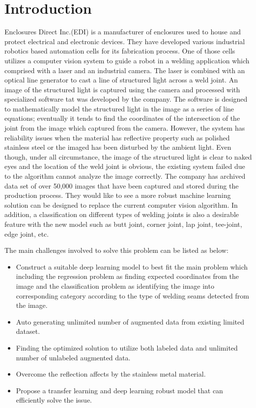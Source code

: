 \section{Introduction}
\label{intro}
Enclosures Direct Inc.(EDI) is a manufacturer of enclosures used to house and protect electrical and electronic devices. 
They have developed various industrial robotics based automation cells for its fabrication process. One of those cells utilizes
a computer vision system to guide a robot in a welding application which comprised with a laser and an industrial camera.
The laser is combined with an optical line generator to cast a line of structured light across a weld joint. An image of the 
structured light is captured using the camera and processed with specialized software tat was developed by the company.
The software is designed to mathematically model the structured light in the image as a series of line equations; eventually
it tends to find the coordinates of the intersection of the joint from the image which captured from the camera. However, 
the system has reliability issues when the material has reflective property such as polished stainless steel or the imaged
has been disturbed by the ambient light. Even though, under all circumstance, the image of the structured light is clear to 
naked eyes and the location of the weld joint is obvious, the existing system failed due to the algorithm cannot analyze the
image correctly. The company has archived data set of over 50,000 images that have been captured and stored during the 
production process. They would like to see a more robust machine learning solution can be designed to replace the current 
computer vision algorithm. In addition, a classification on different types of welding joints is also a desirable feature
with the new model such as butt joint, corner joint, lap joint, tee-joint, edge joint, etc.

The main challenges involved to solve this problem can be listed as below:
\begin{itemize}
\item Construct a suitable deep learning model to best fit the main problem which including the regression problem as finding 
       expected coordinates from the image and the classification problem as identifying the image into corresponding 
       category according to the type of welding seams detected from the image.
\item Auto generating unlimited number of augmented data from existing limited dataset. 
\item Finding the optimized solution to utilize both labeled data and unlimited number of unlabeled augmented data.
\item Overcome the reflection affects by the stainless metal material.
\item Propose a transfer learning and deep learning robust model that can efficiently solve the issue.
\end{itemize}

